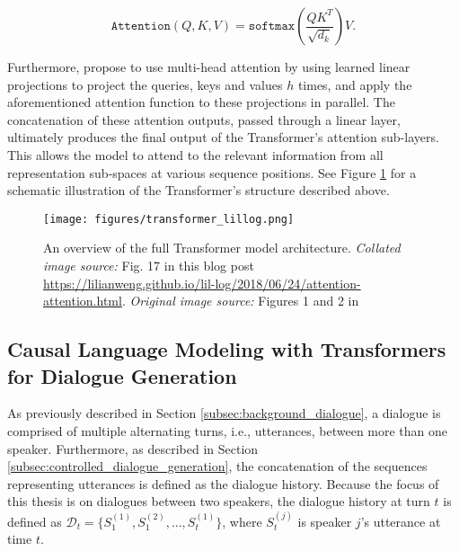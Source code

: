 \begin{equation}
    \texttt{Attention}(Q, K, V) = \texttt{softmax} \left( \frac{QK^T}{\sqrt{d_k}}\right) V.
\end{equation}

Furthermore, \cite{vaswani2017attention} propose to use multi-head attention by using learned linear projections to project the queries, keys and values $h$ times, and apply the aforementioned attention function to these projections in parallel. The concatenation of these attention outputs, passed through a linear layer, ultimately produces the final output of the Transformer's attention sub-layers. This allows the model to attend to the relevant information from all representation sub-spaces at various sequence positions. See Figure \ref{fig:transformer_architecture} for a schematic illustration of the Transformer's structure described above.


\begin{figure}[H]
    \centering
    \texttt{[image: figures/transformer\_lillog.png]}
    \caption{An overview of the full Transformer model architecture. \textit{Collated image source:} Fig. 17 in this blog post \url{https://lilianweng.github.io/lil-log/2018/06/24/attention-attention.html}. \textit{Original image source:} Figures 1 and 2 in \cite{vaswani2017attention}}
    \label{fig:transformer_architecture}
\end{figure}

\subsection{Causal Language Modeling with Transformers for Dialogue Generation}
As previously described in Section \ref{subsec:background_dialogue}, 
a dialogue is comprised of multiple alternating turns, i.e., utterances, between more than one speaker. Furthermore, as described in Section \ref{subsec:controlled_dialogue_generation}, the concatenation of the sequences representing utterances is defined as the dialogue history. Because the focus of this thesis is on dialogues between two speakers, the dialogue history at turn $t$ is defined as $\mathcal{D}_t = \{S^{(1)}_1, S^{(2)}_1, ..., S^{(1)}_t\}$, where $S^{(j)}_t$ is speaker $j$'s utterance at time $t$. 

